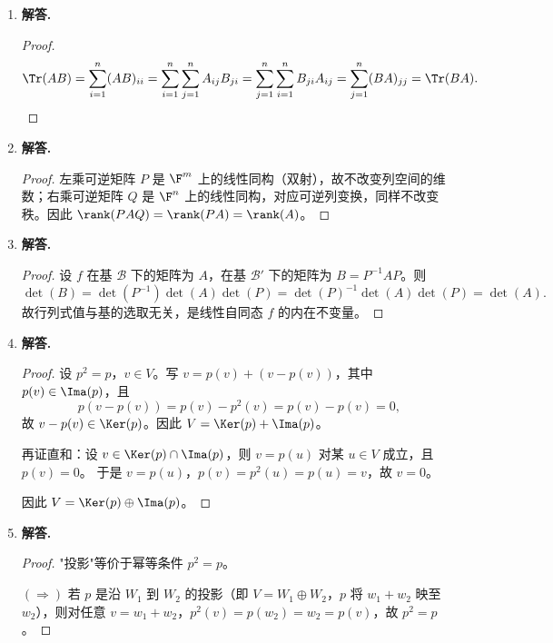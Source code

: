 \begin{enumerate}[label=\textbf{\arabic*.}, leftmargin=*, itemsep=1em]
\begin{proof}
反之，若 $B=P^{-1}AP$ 对某可逆矩阵 $P$ 成立，令新基 $\mathcal{B}'$ 的第 $j$ 个基向量为以 $P$ 的第 $j$ 列为坐标（在 $\mathcal{B}$ 下）的向量，则 $P$ 是从 $\mathcal{B}'$ 到 $\mathcal{B}$ 的过渡矩阵，且 $f$ 在 $\mathcal{B}'$ 下的矩阵恰为 $B$。

故两个方阵相似当且仅当它们表示同一线性自同态在不同基下的矩阵。
\end{proof}

\item \textbf{解答.}
\begin{proof}
\[
  \Tr(AB)=\sum_{i=1}^n(AB)_{ii}=\sum_{i=1}^n\sum_{j=1}^n A_{ij}B_{ji}
  =\sum_{j=1}^n\sum_{i=1}^n B_{ji}A_{ij}=\sum_{j=1}^n(BA)_{jj}=\Tr(BA). \qedhere
\]
\end{proof}

\item \textbf{解答.}
\begin{proof}
左乘可逆矩阵 $P$ 是 $\F^m$ 上的线性同构（双射），故不改变列空间的维数；右乘可逆矩阵 $Q$ 是 $\F^n$ 上的线性同构，对应可逆列变换，同样不改变秩。因此 $\rank(PAQ)=\rank(PA)=\rank(A)$。
\end{proof}

\item \textbf{解答.}
\begin{proof}
设 $f$ 在基 $\mathcal{B}$ 下的矩阵为 $A$，在基 $\mathcal{B}'$ 下的矩阵为 $B=P^{-1}AP$。则
\[
  \det(B)=\det(P^{-1})\det(A)\det(P)=\det(P)^{-1}\det(A)\det(P)=\det(A).
\]
故行列式值与基的选取无关，是线性自同态 $f$ 的内在不变量。
\end{proof}

\item \textbf{解答.}
\begin{proof}
设 $p^2=p$，$v\in V$。写 $v=p(v)+(v-p(v))$，其中 $p(v)\in\Ima(p)$，且
\[
  p(v-p(v))=p(v)-p^2(v)=p(v)-p(v)=0,
\]
故 $v-p(v)\in\Ker(p)$。因此 $V=\Ker(p)+\Ima(p)$。

再证直和：设 $v\in\Ker(p)\cap\Ima(p)$，则 $v=p(u)$ 对某 $u\in V$ 成立，且 $p(v)=0$。
于是 $v=p(u)$，$p(v)=p^2(u)=p(u)=v$，故 $v=0$。

因此 $V=\Ker(p)\oplus\Ima(p)$。
\end{proof}

\item \textbf{解答.}
\begin{proof}
"投影"等价于幂等条件 $p^2=p$。

$(\Rightarrow)$ 若 $p$ 是沿 $W_1$ 到 $W_2$ 的投影（即 $V=W_1\oplus W_2$，$p$ 将 $w_1+w_2$ 映至 $w_2$），则对任意 $v=w_1+w_2$，$p^2(v)=p(w_2)=w_2=p(v)$，故 $p^2=p$。


\end{proof}
\end{enumerate}
